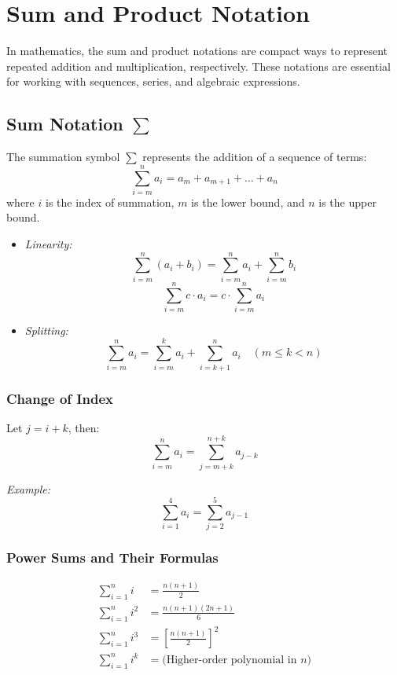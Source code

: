 \section{Sum and Product Notation}

In mathematics, the sum and product notations are compact ways to represent repeated addition and multiplication, respectively. These notations are essential for working with sequences, series, and algebraic expressions.

\subsection{Sum Notation \texorpdfstring{\(\sum\)}{∑}}

The summation symbol \(\sum\) represents the addition of a sequence of terms:
\[
\sum_{i = m}^{n} a_i = a_m + a_{m+1} + \dots + a_n
\]
where \(i\) is the index of summation, \(m\) is the lower bound, and \(n\) is the upper bound.

\begin{itemize}[label=\(-\)]
    \item \emph{Linearity:}
    \[
    \sum_{i = m}^{n} (a_i + b_i) = \sum_{i = m}^{n} a_i + \sum_{i = m}^{n} b_i
    \]
    \[
    \sum_{i = m}^{n} c \cdot a_i = c \cdot \sum_{i = m}^{n} a_i
    \]
    \item \emph{Splitting:}
    \[
    \sum_{i = m}^{n} a_i = \sum_{i = m}^{k} a_i + \sum_{i = k+1}^{n} a_i \quad (m \le k < n)
    \]
\end{itemize}

\subsubsection{Change of Index}

Let \(j = i + k\), then:
\[
\sum_{i = m}^{n} a_i = \sum_{j = m + k}^{n + k} a_{j - k}
\]

\textit{Example:}
\[
\sum_{i = 1}^{4} a_i = \sum_{j = 2}^{5} a_{j - 1}
\]

\subsubsection{Power Sums and Their Formulas}

\begin{align*}
\sum_{i = 1}^{n} i &= \frac{n(n+1)}{2} \\
\sum_{i = 1}^{n} i^2 &= \frac{n(n+1)(2n+1)}{6} \\
\sum_{i = 1}^{n} i^3 &= \left[\frac{n(n+1)}{2}\right]^2 \\
\sum_{i = 1}^{n} i^k &= \text{(Higher-order polynomial in \(n\))}
\end{align*}


